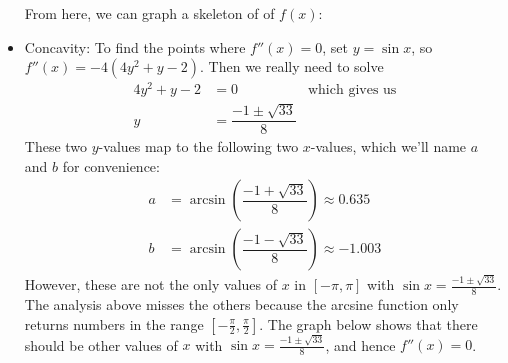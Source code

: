 \begin{solution}
\begin{itemize}
From here, we can graph a skeleton of of $f(x)$:
\begin{center}\end{center}


\item Concavity: To find the points where $f''(x)=0$, set $y=\sin x$, so
$f''(x)=-4(4y^2+y-2)$.
Then we really need to solve
\begin{align*}
  4y^2 +y-2 &=0 & \text{which gives us}\\
  y &= \dfrac{-1 \pm \sqrt{33}}{8}
\end{align*}
These two $y$-values map to the following two $x$-values, which we'll name $a$ and $b$ for convenience:
\begin{align*}
  a &= \arcsin\left(\dfrac{-1 + \sqrt{33}}{8} \right) \approx 0.635\\
  b &= \arcsin\left(\dfrac{-1 - \sqrt{33}}{8} \right)\approx -1.003
\end{align*}
However, these are not the only values of $x$ in $[-\pi,\pi]$ with $\sin x = \frac{-1\pm\sqrt{33}}{8}$.
The analysis above misses the others because the arcsine
function only returns numbers in the range $\left[-\frac{\pi}{2}, \frac{\pi}{2}\right]$. The graph below shows that there should be other values of $x$ with $\sin x = \frac{-1\pm\sqrt{33}}{8}$, and hence $f''(x)=0$.



\end{itemize}
\end{solution}
